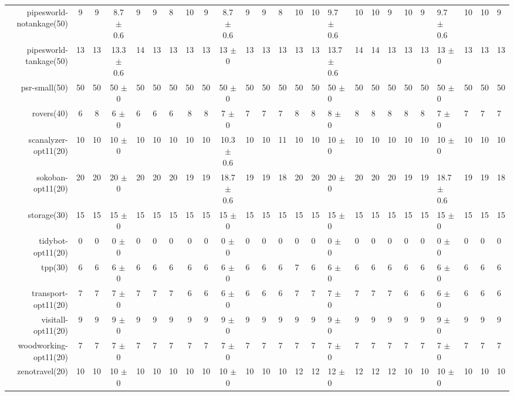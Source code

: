\begin{center}
\begin{tabular}{|rcccHHH|cccHHHHHHHHHHHHHHH|}
pipesworld-notankage(50) & 9 & 9 & 8.7 \(\pm\) 0.6 & 9 & 9 & 8 & 10 & 9 & 8.7 \(\pm\) 0.6 & 9 & 9 & 8 & 10 & 10 & 9.7 \(\pm\) 0.6 & 10 & 10 & 9 & 10 & 9 & 9.7 \(\pm\) 0.6 & 10 & 10 & 9\\
pipesworld-tankage(50) & 13 & 13 & 13.3 \(\pm\) 0.6 & 14 & 13 & 13 & 13 & 13 & 13 \(\pm\) 0 & 13 & 13 & 13 & 13 & 13 & 13.7 \(\pm\) 0.6 & 14 & 14 & 13 & 13 & 13 & 13 \(\pm\) 0 & 13 & 13 & 13\\
psr-small(50) & 50 & 50 & 50 \(\pm\) 0 & 50 & 50 & 50 & 50 & 50 & 50 \(\pm\) 0 & 50 & 50 & 50 & 50 & 50 & 50 \(\pm\) 0 & 50 & 50 & 50 & 50 & 50 & 50 \(\pm\) 0 & 50 & 50 & 50\\
rovers(40) & 6 & 8 & 6 \(\pm\) 0 & 6 & 6 & 6 & 8 & 8 & 7 \(\pm\) 0 & 7 & 7 & 7 & 8 & 8 & 8 \(\pm\) 0 & 8 & 8 & 8 & 8 & 8 & 7 \(\pm\) 0 & 7 & 7 & 7\\
scanalyzer-opt11(20) & 10 & 10 & 10 \(\pm\) 0 & 10 & 10 & 10 & 10 & 10 & 10.3 \(\pm\) 0.6 & 10 & 10 & 11 & 10 & 10 & 10 \(\pm\) 0 & 10 & 10 & 10 & 10 & 10 & 10 \(\pm\) 0 & 10 & 10 & 10\\
sokoban-opt11(20) & 20 & 20 & 20 \(\pm\) 0 & 20 & 20 & 20 & 19 & 19 & 18.7 \(\pm\) 0.6 & 19 & 19 & 18 & 20 & 20 & 20 \(\pm\) 0 & 20 & 20 & 20 & 19 & 19 & 18.7 \(\pm\) 0.6 & 19 & 19 & 18\\
storage(30) & 15 & 15 & 15 \(\pm\) 0 & 15 & 15 & 15 & 15 & 15 & 15 \(\pm\) 0 & 15 & 15 & 15 & 15 & 15 & 15 \(\pm\) 0 & 15 & 15 & 15 & 15 & 15 & 15 \(\pm\) 0 & 15 & 15 & 15\\
tidybot-opt11(20) & 0 & 0 & 0 \(\pm\) 0 & 0 & 0 & 0 & 0 & 0 & 0 \(\pm\) 0 & 0 & 0 & 0 & 0 & 0 & 0 \(\pm\) 0 & 0 & 0 & 0 & 0 & 0 & 0 \(\pm\) 0 & 0 & 0 & 0\\
tpp(30) & 6 & 6 & 6 \(\pm\) 0 & 6 & 6 & 6 & 6 & 6 & 6 \(\pm\) 0 & 6 & 6 & 6 & 7 & 6 & 6 \(\pm\) 0 & 6 & 6 & 6 & 6 & 6 & 6 \(\pm\) 0 & 6 & 6 & 6\\
transport-opt11(20) & 7 & 7 & 7 \(\pm\) 0 & 7 & 7 & 7 & 6 & 6 & 6 \(\pm\) 0 & 6 & 6 & 6 & 7 & 7 & 7 \(\pm\) 0 & 7 & 7 & 7 & 6 & 6 & 6 \(\pm\) 0 & 6 & 6 & 6\\
visitall-opt11(20) & 9 & 9 & 9 \(\pm\) 0 & 9 & 9 & 9 & 9 & 9 & 9 \(\pm\) 0 & 9 & 9 & 9 & 9 & 9 & 9 \(\pm\) 0 & 9 & 9 & 9 & 9 & 9 & 9 \(\pm\) 0 & 9 & 9 & 9\\
woodworking-opt11(20) & 7 & 7 & 7 \(\pm\) 0 & 7 & 7 & 7 & 7 & 7 & 7 \(\pm\) 0 & 7 & 7 & 7 & 7 & 7 & 7 \(\pm\) 0 & 7 & 7 & 7 & 7 & 7 & 7 \(\pm\) 0 & 7 & 7 & 7\\
zenotravel(20) & 10 & 10 & 10 \(\pm\) 0 & 10 & 10 & 10 & 10 & 10 & 10 \(\pm\) 0 & 10 & 10 & 10 & 12 & 12 & 12 \(\pm\) 0 & 12 & 12 & 12 & 10 & 10 & 10 \(\pm\) 0 & 10 & 10 & 10\\
\hline
\end{tabular}
\end{center}
